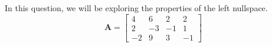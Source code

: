



In this question, we will be exploring the properties of the left nullspace. \\

$$\mathbf{A} = \begin{bmatrix} 4 & 6 & 2 & 2 \\ 2 & -3 & -1 & 1 \\ -2 & 9 & 3 & -1
\end{bmatrix}$$

